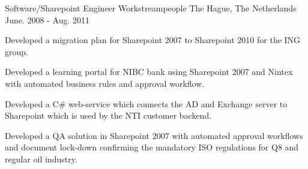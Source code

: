 \begin{cventries}
  \cventry
    {Software/Sharepoint Engineer} %
    {Workstreampeople} %
    {The Hague, The Netherlands} %
    {June. 2008 - Aug. 2011} %
    {
      \begin{cvitems} %
        \item {Developed a migration plan for Sharepoint 2007 to Sharepoint 2010 for the ING group.}
        \item {Developed a learning portal for NIBC bank using Sharepoint 2007 and Nintex with automated business rules and approval workflow.}
        \item {Developed a C\# web-service which connects the AD and Exchange server to Sharepoint which is used by the NTI customer backend.}
        \item {Developed a QA solution in Sharepoint 2007 with automated approval workflows and document lock-down confirming the mandatory ISO regulations for Q8 and regular oil industry.}
      \end{cvitems}
    }

\end{cventries}
\vspace{20 mm}
